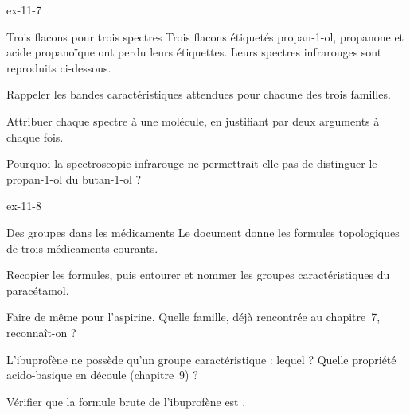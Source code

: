 \begin{blocLivre}{ex-11-7}
\begin{exercice}[2]{Trois flacons pour trois spectres}
Trois flacons étiquetés propan-1-ol, propanone et acide propanoïque ont perdu leurs étiquettes. Leurs spectres
infrarouges sont reproduits ci-dessous.
\begin{questions}
\item Rappeler les bandes caractéristiques attendues pour chacune des trois familles.
\item Attribuer chaque spectre à une molécule, en justifiant par deux arguments à chaque fois.
\item Pourquoi la spectroscopie infrarouge ne permettrait-elle pas de distinguer le propan-1-ol du butan-1-ol ?
\end{questions}
\end{exercice}
\end{blocLivre}
\begin{blocLivre}{ex-11-8}
\begin{exercice}[2]{Des groupes dans les médicaments}
Le document donne les formules topologiques de trois médicaments courants.
\begin{questions}
\item Recopier les formules, puis entourer et nommer les groupes caractéristiques du paracétamol.
\item Faire de même pour l'aspirine. Quelle famille, déjà rencontrée au chapitre~7, reconnaît-on ?
\item L'ibuprofène ne possède qu'un groupe caractéristique : lequel ? Quelle propriété acido-basique en découle
(chapitre~9) ?
\item Vérifier que la formule brute de l'ibuprofène est .
\end{questions}
\end{exercice}
\end{blocLivre}
